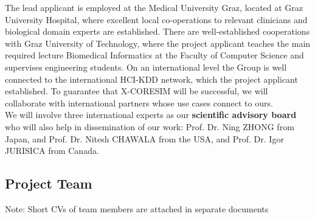 \documentclass[a4paper,11pt]{article}
\begin{document}
The lead applicant is employed at the Medical University Graz, located at Graz University Hospital, where excellent local co-operations to relevant clinicians and biological domain experts are established. There are well-established cooperations with Graz University of Technology, where the project applicant teaches the main required lecture Biomedical Informatics at the Faculty of Computer Science and supervises engineering students. On an international level the Group is well connected to the international HCI-KDD network, which the project applicant established. To guarantee that X-CORESIM will be successful, we will collaborate with international partners whose use cases connect to ours.
\\[0,2cm]

We will involve three international experts as our \textbf{scientific advisory board} who will also help in dissemination of our work: Prof. Dr. Ning ZHONG from Japan, and Prof. Dr. Nitesh CHAWALA from the USA, and Prof. Dr. Igor JURISICA from Canada.

\subsection{Project Team}
Note: Short CVs of team members are attached in separate documents
\end{document}
